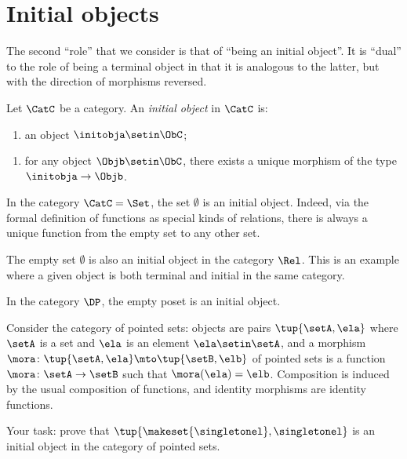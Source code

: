 
\section{Initial objects}
\label{sec:initional}

The second ``role'' that we consider is that of ``being an initial object''. It is ``dual'' to the role of being a terminal object in that it is analogous to the latter, but with the direction of morphisms reversed. 


\begin{ctdefinition}\label{def:initial-object}
    Let $\CatC$ be a category.
    An \emph{initial object} in $\CatC$ is:

    \constit
    \begin{enumerate}
        \item an object $\initobja \setin \ObC$;
    \end{enumerate}
    \condit
    \begin{enumerate}
        \item for any object $\Objb \setin \ObC$, there exists a unique morphism of the type $\initobja \to \Objb$.
    \end{enumerate}
\end{ctdefinition}

\begin{example}
    In the category $\CatC = \Set$, the set $\emptyset$ is an initial object.
    Indeed, via the formal definition of functions as special kinds of relations, there is always a unique function from the empty set to any other set.
\end{example}

\begin{example}\label{exa:init-obj-Rel}
    The empty set $\emptyset$ is also an initial object in the category $\Rel$.
    This is an example where a given object is both terminal and initial in the same category.
\end{example}

\begin{example}\label{exa:init-obj-DP}
    In the category $\DP$, the empty poset is an initial object.
\end{example}

    \begin{gradedexercise}
    
Consider the category of pointed sets: objects are pairs $\tup{\setA, \ela}$ where $\setA$ is a set and $\ela$ is an element $\ela \setin \setA$, and a morphism $\mora \colon \tup{\setA, \ela} \mto \tup{\setB, \elb}$ of pointed sets is a function $\mora \colon \setA \to \setB$ such that $\mora(\ela) = \elb$. Composition is induced by the usual composition of functions, and identity morphisms are identity functions. 

Your task: prove that $\tup{\makeset{\singletonel}, \singletonel}$ is an initial object in the category of pointed sets. 
    \end{gradedexercise}
    
